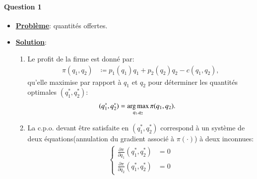 \documentclass[notes, ignorenonframetext, compress, 9pt, xcolor=svgnames, aspectratio=169]{beamer}
\begin{document}
    \begin{frame}
      [allowframebreaks]{\insertsection}
      \framesubtitle{Question 1\\}
      \begin{itemize}
    \item \textbf{\underline{Problème}}:  quantités offertes.
    \item \textbf{\underline{Solution}}: 
    \begin{enumerate}[$\cdot$]
     \item Le profit de la firme est donné par:
     \begin{align}
      \pi(q_1, q_2) &\coloneqq p_1(q_1)q_1 +  p_2(q_2)q_2 - c(q_1, q_2),
      \label{eq9}
     \end{align}
     qu'elle maximise par rapport à $q_1$ et $q_2$ pour déterminer les quantités optimales $(q_1^*, q_2^*)$:
     \begin{align}
      (q_1^*, q_2^*) &=\argmax_{q_1, q_2}\pi(q_1, q_2).  
      \label{eq10}
     \end{align}
     \item La c.p.o. devant être satisfaite en $(q_1^*, q_2^*)$ correspond à un système de deux équations(annulation du gradient
     associé à $\pi(\cdot)$) à deux inconnues:
     \begin{align}
      \left\{
      \begin{array}{ll}
        \frac{\partial \pi}{\partial q_1}(q_1^*, q_2^*) &= 0\\
        \frac{\partial \pi}{\partial q_2}(q_1^*, q_2^*) &= 0
      \end{array}
      \right.
      \label{eq11}
     \end{align}
    \end{enumerate}
  \end{itemize}

    \end{frame}
\end{document}

